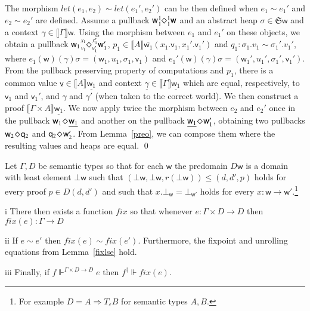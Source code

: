 \documentclass[orivec]{llncs}
\newcommand{\sq}[4]{\tensor*[^{#1}_{#2}]{\Diamond}{^{#3}_{#4}}}
\newcommand{\und}[1]{\underline{#1}}
\newcommand{\eff}{\varepsilon}
\newcommand{\sem}[1]{\ensuremath{\llbracket {#1} \rrbracket}}
\renewenvironment{proof}{\vspace{-1mm} \noindent {\bf Proof}\quad}{\qed}
\newcommand\w{\ensuremath{\mathsf{w}}\xspace}
\newcommand\q{\ensuremath{\mathsf{q}}\xspace}
\newcommand{\Astores}{\mathfrak{S}}
\newcommand\val{\ensuremath{\mathsf{v}}\xspace}
\begin{document}
\begin{proof}
The morphism ${\textit{let}(e_1,e_2)\sim
\textit{let}(e_1',e_2')}$ can be then defined when ${e_1 \sim e_1'}$
and ${e_2 \sim e_2'}$ are defined.
Assume a pullback $\w \sq{1}{1}{1}{1}\w$ and an abstract heap $\sigma \in
\Astores \w$ and a context $\gamma \in \sem{\Gamma}\w$. Using the
morphism between $e_1$ and $e_1'$ on these objects, we obtain a
pullback $\w_1 \sq{x_1}{v_1}{x_1'}{v_1'} \w_1'$, $p_1 \in
\sem{A}\overline{\w_1}(x_1.\val_1, x_1'.\val_1')$ and $q_1 : \sigma_1.v_1
\sim \sigma_1'.v_1'$, where ${e_1}(\w)(\gamma)\sigma = (\w_1, u_1,
\sigma_1,
\val_1)$ and ${e_1'}(\w)(\gamma)\sigma = (\w_1', u_1', \sigma_1',
\val_1')$. 
From the pullback preserving property of computations and $p_1$,
there is a common value $\und{\val} \in \sem{A}\und{\w_1}$ and context
$\und{\gamma} \in \sem{\Gamma}\und{\w_1}$ which are equal, respectively, to
$\val_1$ and $\val_1'$, and $\gamma$ and $\gamma'$ (when taken to the
correct world). We then construct a
proof $\sem{\Gamma \times A} \und{\w_1}$. We now apply twice the
morphism between $e_2$ and $e_2'$ once in the pullback $\w_1 \sq{}{}{}{}
\und{\w_1}$ and
another on the
pullback $\und{\w_1} \sq{}{}{}{} \w_1'$, obtaining two pullbacks
$\w_2 \sq{}{}{}{} \q_2$ and $\q_2 \sq{}{}{}{} \w_2'$. From
Lemma~\ref{preo}, we can compose them where the resulting values and
heaps are equal.
\end{proof}
\begin{lemma}[fix]\label{fixlse}
  Let $\Gamma,D$ be semantic types so that for each $\w$ the predomain
  $D\w$ is a domain with least element $\bot\w$ such that
  $(\bot\w,\bot\w,r(\bot\w))\leq (d,d',p)$ holds for every proof $p\in
  D(d,d')$ and such that $x.\bot_\w=\bot_{\w'}$ holds for every
  $x:\w\rightarrow\w'$.\footnote{For example $D=A {\Rightarrow}T_\eff B$
for semantic types $A,B$.}
\begin{compactenum}
\item[i] There then exists a function
  $\textit{fix}$ so that whenever $e:\Gamma\times D\rightarrow D$ then
  $\textit{fix}(e):\Gamma\rightarrow 
  D$
\item[ii] If $e\sim e'$ then $\textit{fix}(e)\sim
  \textit{fix}(e')$. Furthermore, the fixpoint and unrolling equations
  from Lemma~\ref{fixlse} hold. 
\item[iii] Finally, if $f\Vdash^{\Gamma\times D\rightarrow D}e$ then
$f^\dagger\Vdash \textit{fix}(e)$.    
\end{compactenum}
\end{lemma}
\end{document}
